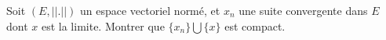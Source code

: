 
\begin{exercice}\label{exo0073}

Soit $(E, || . ||)$ un espace vectoriel normé, et $x_n$ une suite convergente dans $E$ dont $x$ est la limite. Montrer que $\{x_n\}\bigcup\{x\}$ est compact.

\end{exercice}
